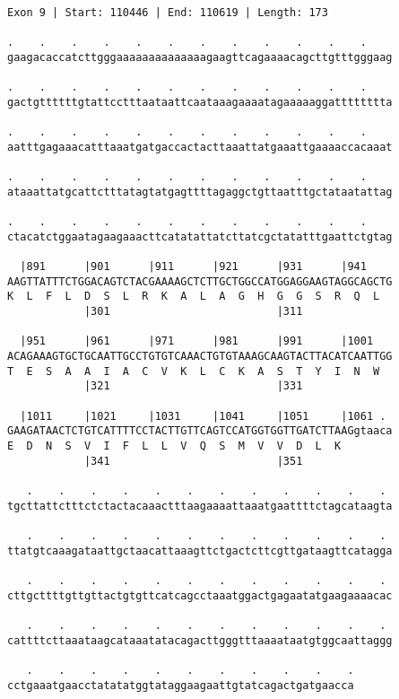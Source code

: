 \documentclass{article}
\begin{document}
\newpage
\begin{Verbatim}
Exon 9 | Start: 110446 | End: 110619 | Length: 173
 
.    .    .    .    .    .    .    .    .    .    .    .    
gaagacaccatcttgggaaaaaaaaaaaaaagaagttcagaaaacagcttgtttgggaag
  
.    .    .    .    .    .    .    .    .    .    .    .    
gactgttttttgtattcctttaataattcaataaagaaaatagaaaaaggatttttttta
  
.    .    .    .    .    .    .    .    .    .    .    .    
aatttgagaaacatttaaatgatgaccactacttaaattatgaaattgaaaaccacaaat
  
.    .    .    .    .    .    .    .    .    .    .    .    
ataaattatgcattctttatagtatgagttttagaggctgttaatttgctataatattag
  
.    .    .    .    .    .    .    .    .    .    .    .    
ctacatctggaatagaagaaacttcatatattatcttatcgctatatttgaattctgtag
  
  |891      |901      |911      |921      |931      |941    
AAGTTATTTCTGGACAGTCTACGAAAAGCTCTTGCTGGCCATGGAGGAAGTAGGCAGCTG
K  L  F  L  D  S  L  R  K  A  L  A  G  H  G  G  S  R  Q  L  
            |301                          |311              
  
  |951      |961      |971      |981      |991      |1001   
ACAGAAAGTGCTGCAATTGCCTGTGTCAAACTGTGTAAAGCAAGTACTTACATCAATTGG
T  E  S  A  A  I  A  C  V  K  L  C  K  A  S  T  Y  I  N  W  
            |321                          |331              
  
  |1011     |1021     |1031     |1041     |1051     |1061 . 
GAAGATAACTCTGTCATTTTCCTACTTGTTCAGTCCATGGTGGTTGATCTTAAGgtaaca
E  D  N  S  V  I  F  L  L  V  Q  S  M  V  V  D  L  K        
            |341                          |351              
  
   .    .    .    .    .    .    .    .    .    .    .    . 
tgcttattctttctctactacaaactttaagaaaattaaatgaattttctagcataagta
  
   .    .    .    .    .    .    .    .    .    .    .    . 
ttatgtcaaagataattgctaacattaaagttctgactcttcgttgataagttcatagga
  
   .    .    .    .    .    .    .    .    .    .    .    . 
cttgcttttgttgttactgtgttcatcagcctaaatggactgagaatatgaagaaaacac
  
   .    .    .    .    .    .    .    .    .    .    .    . 
cattttcttaaataagcataaatatacagacttgggtttaaaataatgtggcaattaggg
  
   .    .    .    .    .    .    .    .    .    .    .
cctgaaatgaacctatatatggtataggaagaattgtatcagactgatgaacca
\end{Verbatim}
\end{document}

